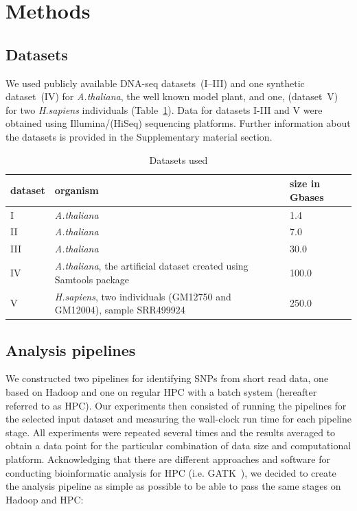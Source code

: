\documentclass[11pt, oneside]{article}   	%
\begin{document}
\section{Methods}
\label{sectionII}

\subsection{Datasets}
We used publicly available DNA-seq datasets~(I--III) and one synthetic dataset~(IV) for {\it A.thaliana}, the well known model plant, and one, (dataset~V) for two {\it H.sapiens} individuals (Table~\ref{table:datasets}). Data for datasets I-III and V were obtained using Illumina/(HiSeq) sequencing platforms. Further information about the datasets is provided in the Supplementary material section.


\begin{table}[htdp]
\small
\footnotesize
\caption{Datasets used}
\begin{center}
\begin{tabular}{|l|l|l|}
dataset &	organism &	size in Gbases\\
\hline
 I		&	{\it A.thaliana}	&	1.4	\\
 II	&	{\it A.thaliana}	&	7.0\\
  III	&	{\it A.thaliana}	&	30.0	\\
 IV	&{\it A.thaliana}, the artificial dataset created using Samtools package	&	100.0	\\
 V	&	{\it H.sapiens}, two individuals (GM12750 and GM12004), sample SRR499924		&	250.0\\

\end{tabular}
\end{center}
\label{table:datasets}
\normalsize
\end{table}%


\subsection{Analysis pipelines}
We constructed two pipelines for identifying SNPs from short read data, one based on Hadoop and one on regular HPC with a batch system (hereafter referred to as HPC). Our experiments then consisted of running the pipelines for the selected input dataset and measuring the wall-clock run time for each pipeline stage. All experiments were repeated several times and the results averaged to obtain a data point for the particular combination of data size and computational platform. Acknowledging that there are different approaches and software for conducting bioinformatic analysis for HPC (i.e. GATK~\cite{gatk}), we decided to create the  analysis pipeline as simple as possible to be able to pass the same stages on Hadoop and HPC:
\end{document}

